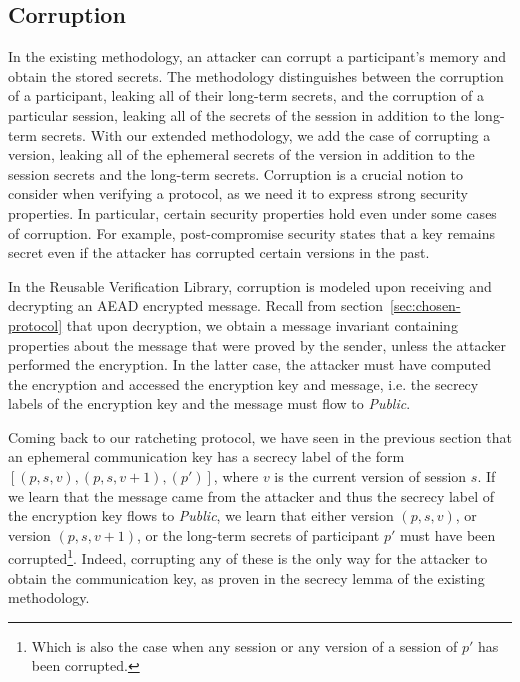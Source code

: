 \subsection{Corruption}

In the existing methodology, an attacker can corrupt a participant's memory and obtain the stored secrets.
The methodology distinguishes between the corruption of a participant, leaking all of their long-term secrets, and the corruption of a particular session, leaking all of the secrets of the session in addition to the long-term secrets.
With our extended methodology, we add the case of corrupting a version, leaking all of the ephemeral secrets of the version in addition to the session secrets and the long-term secrets.
Corruption is a crucial notion to consider when verifying a protocol, as we need it to express strong security properties. In particular, certain security properties hold even under some cases of corruption.
For example, post-compromise security states that a key remains secret even if the attacker has corrupted certain versions in the past.

In the Reusable Verification Library, corruption is modeled upon receiving and decrypting an AEAD encrypted message. 
Recall from section~\ref{sec:chosen-protocol} that upon decryption, we obtain a message invariant containing properties about the message that were proved by the sender, unless the attacker performed the encryption.
In the latter case, the attacker must have computed the encryption and accessed the encryption key and message, i.e. the secrecy labels of the encryption key and the message must flow to \emph{Public}.

Coming back to our ratcheting protocol, we have seen in the previous section that an ephemeral communication key has a secrecy label of the form $[(p,s,v),(p,s,v+1),(p')]$, where $v$ is the current version of session $s$.
If we learn that the message came from the attacker and thus the secrecy label of the encryption key flows to \emph{Public}, we learn that either version $(p,s,v)$, or version $(p,s,v+1)$, or the long-term secrets of participant $p'$ must have been corrupted\footnote{Which is also the case when any session or any version of a session of $p'$ has been corrupted.}.
Indeed, corrupting any of these is the only way for the attacker to obtain the communication key, as proven in the secrecy lemma of the existing methodology.

